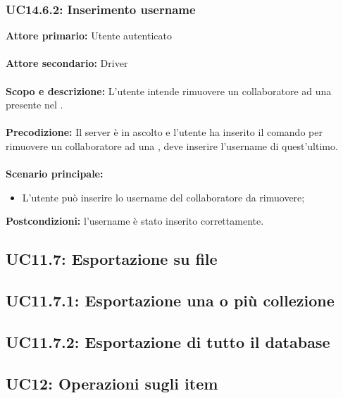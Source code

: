 \documentclass{scalatekids-article}
\begin{document}
\subsubsection{UC14.6.2: Inserimento username}

\textbf{Attore primario:} Utente autenticato\\ \\
\textbf{Attore secondario:} Driver\\ \\
\textbf{Scopo e descrizione:} L’utente intende rimuovere un collaboratore ad una  presente nel .\\ \\
\textbf{Precodizione:} Il server è in ascolto e l’utente ha inserito il comando per rimuovere un collaboratore ad una , deve inserire l'username di quest'ultimo.\\ \\
\textbf{Scenario principale:}
\begin{itemize}
\item L'utente può inserire lo username del collaboratore da rimuovere;
\end{itemize}
\textbf{Postcondizioni:} l'username è stato inserito correttamente.

\subsection{UC11.7: Esportazione su file}

\subsection{UC11.7.1: Esportazione una o più collezione}

\subsection{UC11.7.2: Esportazione di tutto il database}

\subsection{UC12: Operazioni sugli item}
\end{document}
